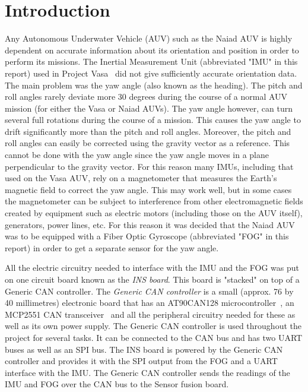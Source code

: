 \section{Introduction}\label{sec:introduction}
Any Autonomous Underwater Vehicle (AUV) such as the Naiad AUV is highly dependent on accurate information about its orientation and position in order to perform its missions. The Inertial Measurement Unit (abbreviated "IMU" in this report) used in Project Vasa~\cite{unpublished:vasa} did not give sufficiently accurate orientation data. The main problem was the yaw angle (also known as the heading). \newline
The pitch and roll angles rarely deviate more 30 degrees during the course of a normal AUV mission (for either the Vasa or Naiad AUVs). The yaw angle however, can turn several full rotations during the course of a mission. This causes the yaw angle to drift significantly more than the pitch and roll angles. Moreover, the pitch and roll angles can easily be corrected using the gravity vector as a reference. This cannot be done with the yaw angle since the yaw angle moves in a plane perpendicular to the gravity vector. \newline
For this reason many IMUs, including that used on the Vasa AUV, rely on a magnetometer that measures the Earth's magnetic field to correct the yaw angle. This may work well, but in some cases the magnetometer can be subject to interference from other electromagnetic fields created by equipment such as electric motors (including those on the AUV itself), generators, power lines, etc. For this reason it was decided that the Naiad AUV was to be equipped with a Fiber Optic Gyroscope (abbreviated "FOG" in this report) in order to get a separate sensor for the yaw angle.

All the electric circuitry needed to interface with the IMU and the FOG was put on one circuit board known as the \emph{INS board}. This board is "stacked" on top of a Generic CAN controller. The \emph{Generic CAN controller} is a small (approx. 76 by 40 millimetres) electronic board that has an AT90CAN128 microcontroller~\cite{web:at90can}, an MCP2551 CAN transceiver~\cite{web:mcp2551} and all the peripheral circuitry needed for these as well as its own power supply. The Generic CAN controller is used throughout the project for several tasks. It can be connected to the CAN bus and has two UART buses as well as an SPI bus. \newline
The INS board is powered by the Generic CAN controller and provides it with the SPI output from the FOG and a UART interface with the IMU. The Generic CAN controller sends the readings of the IMU and FOG over the CAN bus to the Sensor fusion board.
